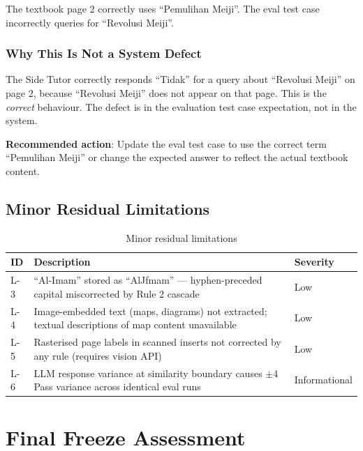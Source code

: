 \documentclass[12pt, a4paper]{report}
\begin{document}
The textbook page 2 correctly uses ``Pemulihan Meiji''. The eval test case
incorrectly queries for ``Revolusi Meiji''.

\subsection{Why This Is Not a System Defect}

The Side Tutor correctly responds ``Tidak'' for a query about ``Revolusi Meiji''
on page 2, because ``Revolusi Meiji'' does not appear on that page. This is the
\emph{correct} behaviour. The defect is in the evaluation test case expectation,
not in the system.

\textbf{Recommended action}: Update the eval test case to use the correct
term ``Pemulihan Meiji'' or change the expected answer to reflect the actual
textbook content.

\section{Minor Residual Limitations}

\begin{table}[H]
  \centering
  \caption{Minor residual limitations}
  \label{tab:minor_limits}
  \begin{tabularx}{\textwidth}{lXl}
    \toprule
    \textbf{ID} & \textbf{Description} & \textbf{Severity} \\
    \midrule
    L-3 & ``Al-Imam'' stored as ``AlJfmam'' — hyphen-preceded capital
          miscorrected by Rule 2 cascade & Low \\
    L-4 & Image-embedded text (maps, diagrams) not extracted; textual
          descriptions of map content unavailable & Low \\
    L-5 & Rasterised page labels in scanned inserts not corrected by
          any rule (requires vision API) & Low \\
    L-6 & LLM response variance at similarity boundary causes
          $\pm$4 Pass variance across identical eval runs & Informational \\
    \bottomrule
  \end{tabularx}
\end{table}


\chapter{Final Freeze Assessment}
\end{document}
